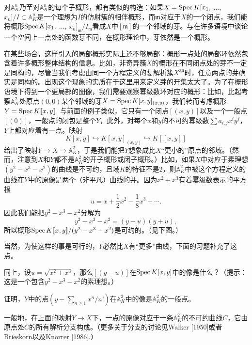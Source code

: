 对$\mathbb{A}_K^n$乃至对$\mathbb{A}_K^n$的每个子概形，都有类似的构造：如果$X=\operatorname{Spec} K[x_1,$ $\dots$, $x_n]/I\subset \mathbb{A}_K^n$是一个理想为$I$的仿射簇的相伴概形，而$\mathfrak{m}$对应于$X$的一个闭点，我们能将概形$\operatorname{Spec} K[x_1,$ $\dots$, $x_n]_\mathfrak{m}/I_{\mathfrak{m}}$看成$X$中$[\mathfrak{m}]$的一个邻域的芽。与在许多语境中谈论一个空间上一点处的函数芽不同，在概形理论中，芽依然是一个概形。

在某些场合，这样引入的局部概形实际上还不够局部：概形一点处的局部环依然包含着许多概形整体结构的信息。比如，非奇异簇$X$的概形在不同闭点处的芽不一定是同构的，尽管当我们考虑由同一个方程定义的复解析簇$X^{\text{an}}$时，任意两点的芽确实是同构的。出现这个现象的实质在于这里用来定义芽的开集太大了。为了在概形语境下得到一个更局部的图像，我们需要观察幂级数环对应的概形：比如，比起考察$\mathbb{A}_K^2$处原点$(0,0)$某个邻域的芽$X=\operatorname{Spec} K[x,y]_{(x,y)}$，我们转而考虑概形$Y=\operatorname{Spec} K [\![x,y]\!]$. 与前面的例子类似，它只有一个闭点$[(x,y)]$以及一个一般点$[(0)]$，一般点的闭包是整个$Y$，此外，对每个$x$和$y$的不可约幂级数$\sum a_{i,j}x^iy^j$，$Y$上都对应着有一点。映射 %
\[
	K[x,y]\hookrightarrow K[x,y]_{(x,y)}\hookrightarrow K[\![x,y]\!]
\]
给出了映射$Y\to X\to \mathbb{A}_K^2$，于是我们能把$Y$想象成比$X$“更小的”原点的邻域。（然而，注意到$X$和$Y$都不是$\mathbb{A}_K^2$的开子概形或闭子概形。）比如，如果$X$中对应于素理想$(y^2-x^3-x^2)$的曲线是不可约，且域$K$的特征不是$2$，则$\mathbb{A}_K^2$中被这个方程定义的曲线在$Y$中的原像是两个（非平凡）曲线的并。因为$x^2+x^3$有着幂级数表示的平方根
\[
	u=x+\frac{1}{2}x^2-\frac{1}{8}x^3+\cdots.
\]
因此我们能把$y^2-x^3-x^2$分解为
\[
	y^2-x^3-x^2=(y-u)(y+u),
\]
所以概形$\operatorname{Spec}  K[\![x,y]\!]/(y^2-x^3-x^2)$是可约的。（见下图。）


当然，为使这样的事是可行的，$Y$必然比$X$有“更多”曲线，下面的习题补充了这点。

\begin{exe}
	\begin{compactenum}[(a)]
		\item 同上，设$u=\sqrt{x^2+x^3}$，那么$[(y-u)]$在$\operatorname{Spec} K[x,y]$中的像是什么？（提示：这是一个包含$y^2-x^3-x^2$的素理想。）
		\item 证明，$Y$中的点$(y-\sum_{n\geq 1}x^n/n!)$在$\mathbb{A}_K^2$中的像是$\mathbb{A}_K^2$的一般点。
	\end{compactenum}
\end{exe}

一般地，在上面的映射$Y\to X$下，一点的原像对应于一条$\mathbb{A}_K^2$的不可约曲线$C$，它由原点处$C$的所有解析分支构成。（更多关于分支的讨论见Walker [1950]或者Brieskorn以及Kn\"{o}rrer [1986].）

